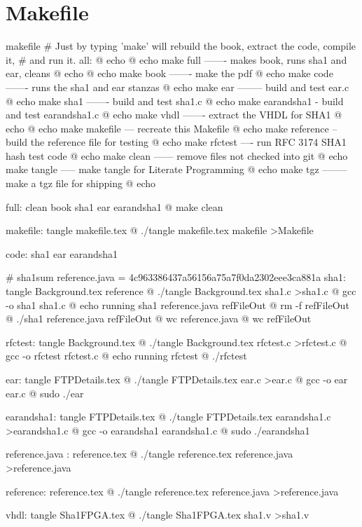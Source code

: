 \chapter{Makefile}
\begin{chunk}{makefile}
# Just by typing 'make' will rebuild the book, extract the code, compile it,
# and run it.
all: 
	@ echo 
	@ echo make full ------- makes book, runs sha1 and ear, cleans
	@ echo 
	@ echo make book ------- make the pdf
	@ echo make code ------- runs the sha1 and ear stanzas
	@ echo make ear -------- build and test ear.c
	@ echo make sha1 ------- build and test sha1.c
	@ echo make earandsha1 - build and test earandsha1.c
	@ echo make vhdl ------- extract the VHDL for SHA1
	@ echo 
	@ echo make makefile --- recreate this Makefile
	@ echo make reference -- build the reference file for testing
	@ echo make rfctest ---- run RFC 3174 SHA1 hash test code
	@ echo make clean ------ remove files not checked into git
	@ echo make tangle ----- make tangle for Literate Programming
	@ echo make tgz -------- make a tgz file for shipping
	@ echo 

full: clean book sha1 ear earandsha1
	@ make clean

makefile: tangle makefile.tex
	@ ./tangle makefile.tex makefile >Makefile

code: sha1 ear earandsha1

# sha1sum reference.java = 4c963386437a56156a75a7f0da2302eee3ca881a  
sha1: tangle Background.tex reference
	@ ./tangle Background.tex sha1.c >sha1.c
	@ gcc -o sha1 sha1.c
	@ echo running sha1 reference.java refFileOut
	@ rm -f refFileOut
	@ ./sha1 reference.java refFileOut
	@ wc reference.java
	@ wc refFileOut

rfctest: tangle Background.tex 
	@ ./tangle Background.tex rfctest.c >rfctest.c
	@ gcc -o rfctest rfctest.c
	@ echo running rfctest
	@ ./rfctest

ear: tangle FTPDetails.tex
	@ ./tangle FTPDetails.tex ear.c >ear.c
	@ gcc -o ear ear.c
	@ sudo ./ear

earandsha1: tangle FTPDetails.tex
	@ ./tangle FTPDetails.tex earandsha1.c >earandsha1.c
	@ gcc -o earandsha1 earandsha1.c
	@ sudo ./earandsha1

reference.java : reference.tex 
	@ ./tangle reference.tex reference.java >reference.java

reference: reference.tex 
	@ ./tangle reference.tex reference.java >reference.java

vhdl: tangle Sha1FPGA.tex
	@ ./tangle Sha1FPGA.tex sha1.v >sha1.v


\end{chunk}

